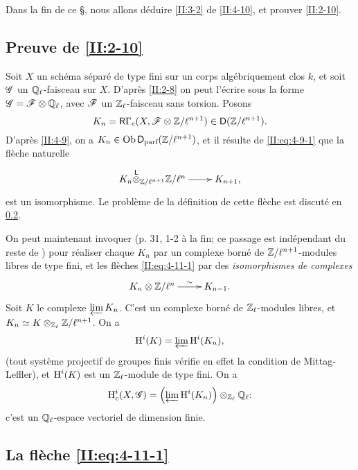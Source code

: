 Dans la fin de ce \S, nous allons d\'eduire \ref{II:3-2} de \ref{II:4-10}, et 
prouver \ref{II:2-10}. 





\subsection{Preuve de \texorpdfstring{\ref{II:2-10}}{2.10}}\label{II:4-11}

Soit $X$ un sch\'ema s\'epar\'e de type fini sur un corps alg\'ebriquement clos 
$k$, et soit $\mathscr{G}$ un $\mathbb{Q}_\ell$-faisceau sur $X$. D'apr\`es \ref{II:2-8} on 
peut l'\'ecrire sous la forme $\mathscr{G}=\mathscr{F}\otimes\mathbb{Q}_\ell$, avec $\mathscr{F}$ un 
$\mathbb{Z}_\ell$-faisceau sans torsion. Posons 
\[
  K_n = \mathsf{R} \Gamma_c(X,\mathscr{F}\otimes\mathbb{Z}/\ell^{n+1})\in\mathsf{D}(\mathbb{Z}/\ell^{n+1}) \text{.}
\]
D'apr\`es \ref{II:4-9}, on a $K_n\in\operatorname{Ob}\mathsf{D}_\text{parf}(\mathbb{Z}/\ell^{n+1})$, et il 
r\'esulte de \eqref{II:eq:4-9-1} que la fl\`eche naturelle 
\begin{equation}\label{II:eq:4-11-1}
\xymatrix{
  K_n\lotimes_{\dZ/\ell^{n+1}} \dZ/\ell^n \ar[r] & K_{n+1} \text{,}
}
\end{equation}
est un isomorphisme. Le probl\`eme de la d\'efinition de cette fl\`eche est 
discut\'e en \ref{II:4-12}. 

On peut maintenant invoquer \cite[XI.3.3]{SGA5} (p. 31, 1-2 \`a la fin; ce 
passage est ind\'ependant du reste de \cite{SGA5}) pour r\'ealiser chaque 
$K_n$ par un complexe born\'e de $\mathbb{Z}/\ell^{n+1}$-modules libres de type fini, 
et les fl\`eches \eqref{II:eq:4-11-1} par des \emph{isomorphismes de complexes} 
\[\xymatrix{
  K_n\otimes \dZ/\ell^n \ar[r]^-\sim 
    & K_{n-1} \text{.}
}\]
Soit $K$ le complexe $\varprojlim K_n$. C'est un complexe born\'e de 
$\mathbb{Z}_\ell$-modules libres, et $K_n\simeq K\otimes_{\mathbb{Z}_\ell}\mathbb{Z}/\ell^{n+1}$. On 
a 
\[
  \operatorname{H}^i(K) = \varprojlim \operatorname{H}^i(K_n) \text{,}
\]
(tout syst\`eme projectif de groupes finis v\'erifie en effet la condition de 
Mittag-Leffler), et $\operatorname{H}^i(K)$ est un $\mathbb{Z}_\ell$-module de type fini. On a 
\[
  \operatorname{H}_c^i(X,\mathscr{G}) = \left(\varprojlim \operatorname{H}^i(K_n) \right)\otimes_{\mathbb{Z}_\ell} \mathbb{Q}_\ell \text{:}
\]
c'est un $\mathbb{Q}_\ell$-espace vectoriel de dimension finie. 





\subsection{La fl\`eche \texorpdfstring{\eqref{II:eq:4-11-1}}{(4.11.1)}}\label{II:4-12}

